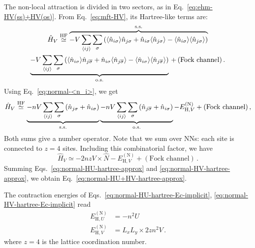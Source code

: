 \begin{tabproof}
	The non-local attraction is divided in two sectors, as in Eq.~\eqref{eq:ehm-HV(ss)+HV(os)}. From Eq.~\eqref{eq:mft-HV}, its Hartree-like terms are:
	\begin{multline}
		\hat H_V \HFsimeq 
		\overbrace{
			-V \sum_{\ev{ij}} \sum_\sigma \left(
				\langle 
				\hat n_{i\sigma}
				\rangle \hat n_{j\sigma} + \hat n_{i\sigma} \langle 
				\hat n_{j\sigma}
				\rangle - \langle 
				\hat n_{i\sigma}
				\rangle \langle 
				\hat n_{j\sigma}
				\rangle
			\right)
		}^{\mathrm{s.s.}} \\
		\underbrace{
			-V \sum_{\ev{ij}} \sum_\sigma \left(
				\langle
				\hat n_{i\sigma}
				\rangle \hat n_{j\overline{\sigma}} + \hat n_{i\sigma} \langle 
				\hat n_{j\overline{\sigma}}
				\rangle
				- \langle 
				\hat n_{i\sigma}
				\rangle \langle 
				\hat n_{j\overline{\sigma}}
				\rangle
			\right)
		}_{\mathrm{o.s.}} \, +\, 
		(\text{Fock channel}) \, . \label{eq:normal-hartree-HV}
	\end{multline}
	Using Eq.~\eqref{eq:normal-<n_i>}, we get
	\begin{equation}\label{eq:normal-hartree-HV-int1}
		\hat H_V \HFsimeq  \underbrace{
			-nV \sum_{\ev{ij}} \sum_\sigma \left(
			\hat n_{j\sigma} + \hat n_{i\sigma}
			\right)
		}_{\mathrm{s.s.}}
		\underbrace{
			-nV \sum_{\ev{ij}} \sum_\sigma \left(
			\hat n_{j\overline{\sigma}} + \hat n_{i\sigma}
			\right)
		}_{\mathrm{o.s.}} 
		- E_{\mathrm{H},V}^{(\mathrm{N})}
		+ (\text{Fock channel}) \, ,
	\end{equation}
	Both sums give a number operator. Note that we sum over NNs: each site is connected to $z=4$ sites. Including this combinatorial factor, we have
	\begin{equation}\label{eq:normal-HV-hartree-approx}
		\hat H_V \simeq -2nzV \times \hat N - E_{\mathrm{H},V}^{(\mathrm{N})} + 
		(\text{Fock channel}) \, .
	\end{equation}
	Summing Eqs.~\eqref{eq:normal-HU-hartree-approx} and \eqref{eq:normal-HV-hartree-approx}, we obtain Eq.~\eqref{eq:normal-HU+HV-hartree-approx}.
\end{tabproof}

The contraction energies of Eqs.~\eqref{eq:normal-HU-hartree-Ec-implicit}, \eqref{eq:normal-HV-hartree-Ec-implicit} read
\begin{align}
	E_{\mathrm{H},U}^{(\mathrm{N})} &= -n^2 U \label{eq:normal-HU-hartree-Ec} \\
	E_{\mathrm{H},V}^{(\mathrm{N})}
	&= L_x L_y \times 2zn^2 V \, . \label{eq:normal-HV-hartree-Ec}
\end{align}
where $z=4$ is the lattice coordination number.

